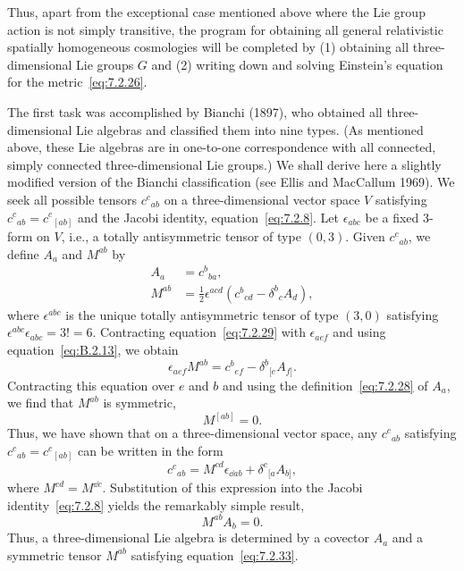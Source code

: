 Thus, apart from the exceptional case mentioned above where the Lie group action
is not simply transitive, the program for obtaining all general relativistic spatially
homogeneous cosmologies will be completed by (1) obtaining all three-dimensional
Lie groups \(G\) and (2) writing down and solving Einstein's equation for the
metric~\eqref{eq:7.2.26}.

The first task was accomplished by Bianchi (1897), who obtained all
three-dimensional Lie algebras and classified them into nine types. (As mentioned
above, these Lie algebras are in one-to-one correspondence with all connected,
simply connected three-dimensional Lie groups.) We shall derive here a slightly
modified version of the Bianchi classification (see Ellis and MacCallum 1969). We
seek all possible tensors \(c^c{}_{ab}\) on a three-dimensional vector space \(V\)
satisfying \(c^c{}_{ab}=c^c{}_{[ab]}\) and the Jacobi identity,
equation~\eqref{eq:7.2.8}. Let \(\epsilon_{abc}\) be a fixed 3-form on \(V\),
i.e., a totally antisymmetric tensor of type \((0,3)\). Given \(c^c{}_{ab}\), we
define \(A_a\) and \(M^{ab}\) by
\begin{align}
  A_a&=c^b{}_{ba} ,
  \tag{7.2.28}\label{eq:7.2.28}\\
  M^{ab}&=\frac12\epsilon^{acd}
    \left(c^b{}_{cd}-\delta^b{}_cA_d\right) ,
  \tag{7.2.29}\label{eq:7.2.29}
\end{align}
where \(\epsilon^{abc}\) is the unique totally antisymmetric tensor of type
\((3,0)\) satisfying \(\epsilon^{abc}\epsilon_{abc}=3!=6\). Contracting
equation~\eqref{eq:7.2.29} with \(\epsilon_{aef}\) and using
equation~\eqref{eq:B.2.13}, we obtain
\begin{equation}
  \epsilon_{aef}M^{ab}
    =c^b{}_{ef}-\delta^b{}_{[e}A_{f]} .
  \tag{7.2.30}\label{eq:7.2.30}
\end{equation}
Contracting this equation over \(e\) and \(b\) and using the
definition~\eqref{eq:7.2.28} of \(A_a\), we find that \(M^{ab}\) is symmetric,
\begin{equation}
  M^{[ab]}=0 .
  \tag{7.2.31}\label{eq:7.2.31}
\end{equation}
Thus, we have shown that on a three-dimensional vector space, any \(c^c{}_{ab}\)
satisfying \(c^c{}_{ab}=c^c{}_{[ab]}\) can be written in the form
\begin{equation}
  c^c{}_{ab}
    =M^{cd}\epsilon_{\dd ab}+\delta^c{}_{[a}A_{b]} ,
  \tag{7.2.32}\label{eq:7.2.32}
\end{equation}
where \(M^{cd}=M^{\dd c}\). Substitution of this expression into the Jacobi
identity~\eqref{eq:7.2.8} yields the remarkably simple result,
\begin{equation}
  M^{ab}A_b=0 .
  \tag{7.2.33}\label{eq:7.2.33}
\end{equation}
Thus, a three-dimensional Lie algebra is determined by a covector \(A_a\) and a
symmetric tensor \(M^{ab}\) satisfying equation~\eqref{eq:7.2.33}.

